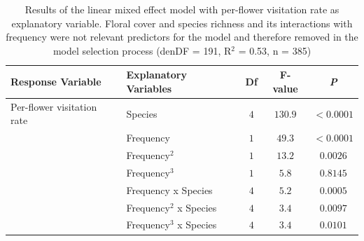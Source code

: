 \begin{table} [!htbp] %
	\centering
	\caption{Results of the linear mixed effect model with per-flower visitation rate as explanatory variable. Floral cover and species richness and its interactions with frequency were not relevant predictors for the model and therefore removed in the model selection process (denDF = 191, R$^{2}$ = 0.53, n = 385)}
	\begin{tabular} { l l c c c}
		\toprule
		\textbf{Response Variable} & \textbf{Explanatory Variables} & \textbf{Df} & \textbf{F-value} & \textbf{\textit{P}} \\
		\midrule
		Per-flower visitation rate   & Species & $4$ & $130.9$ & $<0.0001$\\
		& Frequency 			&  $1$ & $49.3$ & $<0.0001$ \\
		& Frequency$^{2}$ 		&  $1$ & $13.2$ & $0.0026$ \\
		& Frequency$^{3}$ 		&  $1$ & $ 5.8$ &  $0.8145$ \\
		& Frequency x Species &  $4$ & $ 5.2$ &  $0.0005$ \\
		& Frequency$^{2}$ x Species & $4$ & $3.4$ & $0.0097$\\
		& Frequency$^{3}$ x Species & $4$ & $3.4$ & $0.0101$\\
		\bottomrule
	\end{tabular}
	\label{tab:anova}
\end{table}
